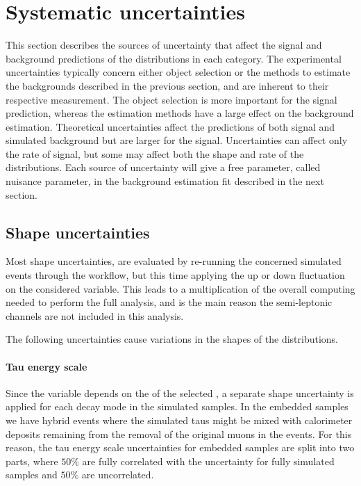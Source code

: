 \section{Systematic uncertainties}
\label{sec:analysis_systematics}

This section describes the sources of uncertainty that affect the signal and background predictions of the \mttot distributions in each category. The experimental uncertainties typically concern either object selection or the methods to estimate the backgrounds described in the previous section, and are inherent to their respective measurement. The object selection is more important for the signal prediction, whereas the estimation methods have a large effect on the background estimation. Theoretical uncertainties affect the predictions of both signal and simulated background but are larger for the signal. Uncertainties can affect only the rate of signal, but some may affect both the shape and rate of the distributions. Each source of uncertainty will give a free parameter, called nuisance parameter, in the background estimation fit described in the next section.

\subsection{Shape uncertainties}

Most shape uncertainties, are evaluated by re-running the concerned simulated events through the workflow, but this time applying the up or down fluctuation on the considered variable. This leads to a multiplication of the overall computing needed to perform the full analysis, and is the main reason the semi-leptonic channels are not included in this analysis.

The following uncertainties cause variations in the shapes of the distributions.

\paragraph{Tau energy scale} Since the \mttot variable depends on the \pt of the selected \tauh, a separate shape uncertainty is applied for each decay mode in the simulated samples. In the embedded samples we have hybrid events where the simulated taus might be mixed with calorimeter deposits remaining from the removal of the original muons in the events. For this reason, the tau energy scale uncertainties for embedded samples are split into two parts, where $50\%$ are fully correlated with the uncertainty for fully simulated samples and $50\%$ are uncorrelated.

